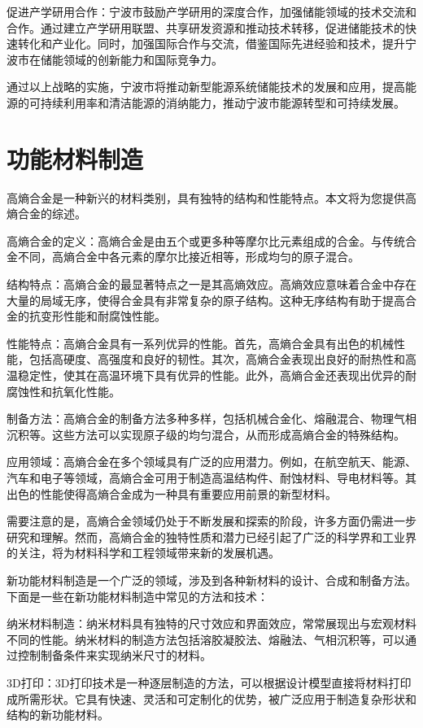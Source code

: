 促进产学研用合作：宁波市鼓励产学研用的深度合作，加强储能领域的技术交流和合作。通过建立产学研用联盟、共享研发资源和推动技术转移，促进储能技术的快速转化和产业化。同时，加强国际合作与交流，借鉴国际先进经验和技术，提升宁波市在储能领域的创新能力和国际竞争力。

通过以上战略的实施，宁波市将推动新型能源系统储能技术的发展和应用，提高能源的可持续利用率和清洁能源的消纳能力，推动宁波市能源转型和可持续发展。
\section{功能材料制造}
高熵合金是一种新兴的材料类别，具有独特的结构和性能特点。本文将为您提供高熵合金的综述。

高熵合金的定义：高熵合金是由五个或更多种等摩尔比元素组成的合金。与传统合金不同，高熵合金中各元素的摩尔比接近相等，形成均匀的原子混合。

结构特点：高熵合金的最显著特点之一是其高熵效应。高熵效应意味着合金中存在大量的局域无序，使得合金具有非常复杂的原子结构。这种无序结构有助于提高合金的抗变形性能和耐腐蚀性能。

性能特点：高熵合金具有一系列优异的性能。首先，高熵合金具有出色的机械性能，包括高硬度、高强度和良好的韧性。其次，高熵合金表现出良好的耐热性和高温稳定性，使其在高温环境下具有优异的性能。此外，高熵合金还表现出优异的耐腐蚀性和抗氧化性能。

制备方法：高熵合金的制备方法多种多样，包括机械合金化、熔融混合、物理气相沉积等。这些方法可以实现原子级的均匀混合，从而形成高熵合金的特殊结构。

应用领域：高熵合金在多个领域具有广泛的应用潜力。例如，在航空航天、能源、汽车和电子等领域，高熵合金可用于制造高温结构件、耐蚀材料、导电材料等。其出色的性能使得高熵合金成为一种具有重要应用前景的新型材料。

需要注意的是，高熵合金领域仍处于不断发展和探索的阶段，许多方面仍需进一步研究和理解。然而，高熵合金的独特性质和潜力已经引起了广泛的科学界和工业界的关注，将为材料科学和工程领域带来新的发展机遇。


新功能材料制造是一个广泛的领域，涉及到各种新材料的设计、合成和制备方法。下面是一些在新功能材料制造中常见的方法和技术：

纳米材料制造：纳米材料具有独特的尺寸效应和界面效应，常常展现出与宏观材料不同的性能。纳米材料的制造方法包括溶胶凝胶法、熔融法、气相沉积等，可以通过控制制备条件来实现纳米尺寸的材料。

3D打印：3D打印技术是一种逐层制造的方法，可以根据设计模型直接将材料打印成所需形状。它具有快速、灵活和可定制化的优势，被广泛应用于制造复杂形状和结构的新功能材料。

